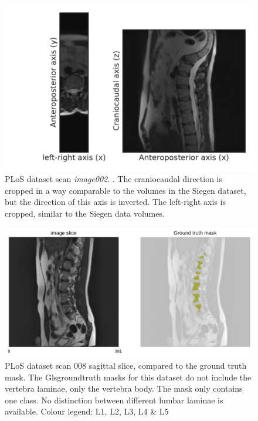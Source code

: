 \begin{figure}
    \centering
    \includegraphics[width=.95\textwidth]{automated_graphs/PLoS_img02.pdf}
    \caption{
        PLoS dataset scan \textit{image002}. \label{fig:PLoS_img02}. The craniocaudal direction is cropped in a way comparable to the volumes in the Siegen dataset, but the direction of this axis is inverted.
        The left-right axis is cropped, similar to the Siegen data volumes.
    }
\end{figure}
\begin{figure}
    \centering
    \includegraphics[width=.95\textwidth]{images/PLoS_s8_mask.pdf}
    \caption{
        PLoS dataset scan 008 sagittal slice, compared to the ground truth mask.
        The Gls{groundtruth} masks for this dataset do not include the vertebra laminae, only the vertebra body.
        The mask only contains one class. No distinction between different lumbar laminae is available.
        \newline\noindent Colour legend: \newline
\noindent{}  L1, L2, L3, L4 \& L5
    }
\end{figure}